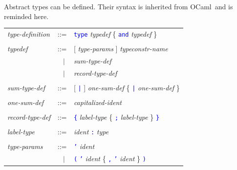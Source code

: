 \documentclass[11pt,titlepage,twoside]{report}
\newcommand{\ocaml}{{\sf OCaml}}
\newcommand{\alt}{\;|\;}
\newcommand{\term}[1]{\textcolor{Blue}{\tt #1}}
\newcommand{\nterm}[1]{\textcolor{BrickRed}{\it #1}}
\newcommand{\term}[1]{{\tt #1}}
\newcommand{\nterm}[1]{{\em #1}}
\begin{document}
Abstract types can be defined. Their syntax is inherited from \ocaml\
and is reminded here. 
\begin{center}
\begin{tabular}{lcl}
\nterm{type-definition} 
  & ::=    & \term{type} \nterm{typedef} 
             \{ \term{and} \nterm{typedef} \} 
\\ \\
\nterm{typedef}
  & ::=        & [ \nterm{type-params} ] \nterm{typeconstr-name} \\
  & $\;\;\alt$ & \nterm{sum-type-def} \\
  & $\;\;\alt$ & \nterm{record-type-def} 
\\ \\
\nterm{sum-type-def}
  & ::=        & [ \term{|} ] \nterm{one-sum-def} 
                 \{ \term{|} \nterm{one-sum-def} \} 
\\ \\
\nterm{one-sum-def}     
& ::=        & \nterm{capitalized-ident}
\\ \\
\nterm{record-type-def} 
  & ::=        & \term{\{} \nterm{label-type}
                 \{ \term{;} \nterm{label-type} \} \term{\}} 
\\ \\
\nterm{label-type}
  & ::=        & \nterm{ident} \term{:} \nterm{type} 
\\ \\
\nterm{type-params}
  & ::=        & \term{'} \nterm{ident} \\
  & $\;\;\alt$ & \term{(} \term{'} \nterm{ident} 
                 \{ \term{,} \term{'} \nterm{ident} \} \term{)}
\end{tabular}
\end{center}

\end{document}
